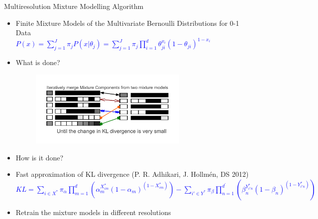 \documentclass[first=orange,second=purple,logo=redexc]{aaltoslides}
\begin{document}
\begin{frame}{Multiresolution Mixture Modelling Algorithm}
\begin{itemize}
 \item Finite Mixture Models of the Multivariate Bernoulli Distributions  for 0-1 Data\\  
    \vspace{0.1cm}  
\textcolor{blue} { $ P(x) = \sum _{j=1}^{J} \pi _{j} P(x|\theta _{j}) = \sum _{j=1}^{J} \pi _{j} \prod _{i=1}^{d} \theta_{ji}^{x_i}(1-\theta _{ji})^{1-x_{i}}$ } \\
 \scriptsize \item What is done?

\vspace{-1mm}
\begin{figure}
\centering
  \includegraphics[trim=1.2cm 0cm 0cm 1cm, clip=true,width=0.72\textwidth]{figures/idasecondpage}
\end{figure}
\vspace{-5mm}
\scriptsize
\item How is it done?
\item Fast approximation of KL divergence (P. R. Adhikari, J. Hollm\'en, DS 2012) \\ %
\scriptsize
\textcolor{blue} {$KL  =  \displaystyle \sum_{i \in X^{*}} \pi_{\alpha} \displaystyle
\prod _{m=1}^{{d}}
\left(\alpha_m^{X^{*}_{im}}(1-\alpha_{m})^{(1-X^{*}_{im})} \right) -
\displaystyle \sum_{i{\prime} \in Y^{*}} \pi_{\beta} \displaystyle \prod
_{n=1}^{{d^{\prime}}} \left(
\beta_{n}^{Y^{*}_{i{\prime}n}}(1-\beta_{n})^{(1-Y^{*}_{i{\prime}n})} \right)
$}
\normalsize \item Retrain the mixture models in different resolutions
\end{itemize}
\end{frame}

% 
\end{document}
